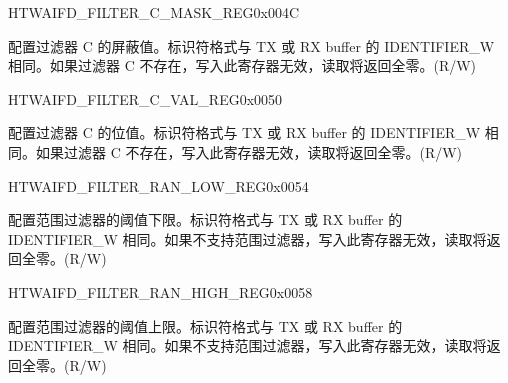 \begin{register}{H}{TWAIFD\_FILTER\_C\_MASK\_REG}{0x004C}\label{regdesc:TWAIFDFILTERCMASKREG}
%
%
\regnewline%
\begin{regdesc}\begin{reglist}
\label{fielddesc:TWAIFDBITMASKCVAL}\item [TWAIFD\_BIT\_MASK\_C\_VAL] 配置过滤器 C 的屏蔽值。标识符格式与 TX 或 RX buffer 的 IDENTIFIER\_W 相同。如果过滤器 C 不存在，写入此寄存器无效，读取将返回全零。(R/W)
\end{reglist}\end{regdesc}
\end{register}


\begin{register}{H}{TWAIFD\_FILTER\_C\_VAL\_REG}{0x0050}\label{regdesc:TWAIFDFILTERCVALREG}
%
%
\regnewline%
\begin{regdesc}\begin{reglist}
\label{fielddesc:TWAIFDBITVALCVAL}\item [TWAIFD\_BIT\_VAL\_C\_VAL] 配置过滤器 C 的位值。标识符格式与 TX 或 RX buffer 的 IDENTIFIER\_W 相同。如果过滤器 C 不存在，写入此寄存器无效，读取将返回全零。(R/W)
\end{reglist}\end{regdesc}
\end{register}


\begin{register}{H}{TWAIFD\_FILTER\_RAN\_LOW\_REG}{0x0054}\label{regdesc:TWAIFDFILTERRANLOWREG}
%
%
\regnewline%
\begin{regdesc}\begin{reglist}
\label{fielddesc:TWAIFDBITRANLOWVAL}\item [TWAIFD\_BIT\_RAN\_LOW\_VAL] 配置范围过滤器的阈值下限。标识符格式与 TX 或 RX buffer 的 IDENTIFIER\_W 相同。如果不支持范围过滤器，写入此寄存器无效，读取将返回全零。(R/W)
\end{reglist}\end{regdesc}
\end{register}


\begin{register}{H}{TWAIFD\_FILTER\_RAN\_HIGH\_REG}{0x0058}\label{regdesc:TWAIFDFILTERRANHIGHREG}
%
%
\regnewline%
\begin{regdesc}\begin{reglist}
\label{fielddesc:TWAIFDBITRANHIGHVAL}\item [TWAIFD\_BIT\_RAN\_HIGH\_VAL] 配置范围过滤器的阈值上限。标识符格式与 TX 或 RX buffer 的 IDENTIFIER\_W 相同。如果不支持范围过滤器，写入此寄存器无效，读取将返回全零。(R/W)
\end{reglist}\end{regdesc}
\end{register}


